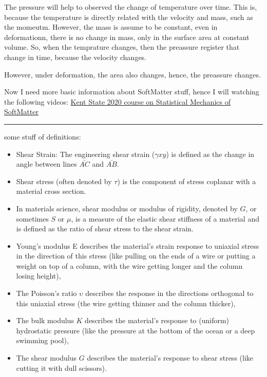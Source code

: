 \documentclass[a4paper, 11pt, oneside]{researchjournal} %
\begin{document}
The pressure will help to observed the change of temperature over time.
This is, because the temperature is directly related with the velocity and mass, such as the momeutm.
However, the mass is assume to be constant, even in deformationn, there is no change in mass, only in the surface area at constant volume.
So, when the temprature changes, then the preassure register that change in time, because the velocity changes.

However, under deformation, the area also changes, hence, the preassure changes.

Now I need more basic information about SoftMatter stuff, hence I will watching the following videos:  \href{https://www.youtube.com/watch?v=fwratvdgoT4&list=PL7B_29ynGKv3v81zK9C9AcTNtGDCvbojV}{Kent State 2020 course on Statistical Mechanics of SoftMatter}

\rule{\textwidth}{0.4pt}

some stuff of definitions:
\begin{itemize}
	\item Shear Strain: The engineering shear strain ($\gamma xy$) is defined as the change in angle between lines $\bar{AC}$ and $\bar{AB}$.
	\item Shear stress (often denoted by $\tau$) is the component of stress coplanar with a material cross section.
	\item In materials science, shear modulus or modulus of rigidity, denoted by $G$, or sometimes $S$ or $\mu$, is a measure of the elastic shear stiffness of a material and is defined as the ratio of shear stress to the shear strain.
	\item  Young's modulus E describes the material's strain response to uniaxial stress in the direction of this stress (like pulling on the ends of a wire or putting a weight on top of a column, with the wire getting longer and the column losing height),
    \item The Poisson's ratio $\upsilon$ describes the response in the directions orthogonal to this uniaxial stress (the wire getting thinner and the column thicker),
    \item The bulk modulus $K$ describes the material's response to (uniform) hydrostatic pressure (like the pressure at the bottom of the ocean or a deep swimming pool),
    \item The shear modulus $G$ describes the material's response to shear stress (like cutting it with dull scissors).
\end{itemize}
\end{document}
